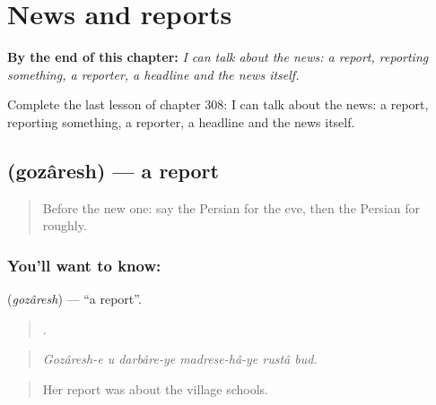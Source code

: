 
\chapter{News and reports}
\label{ch:fa-news-and-reports}

\begin{chapteropening}
\textbf{By the end of this chapter:} \emph{I can talk about the news: a report, reporting something, a reporter, a headline and the news itself.}

Complete the last lesson of chapter 308: I can talk about the news: a report, reporting something, a reporter, a headline and the news itself.
\end{chapteropening}

\section[\texorpdfstring{\fa{گزارش} (gozâresh)}{گزارش (gozâresh)}]{ (gozâresh) — a report}

\label{lesson:FA-C308-gozaresh}



\begin{quote}
Before the new one: say the Persian for the eve, then the Persian for roughly.
\end{quote}

\subsection*{You'll want to know: }
\textbf{} (\emph{gozâresh}) — \textquotedblleft{}a report\textquotedblright{}.

\begin{quote}
      .
\end{quote}

\begin{quote}
\emph{Gozâresh-e u darbâre-ye madrese-hâ-ye rustâ bud.}
\end{quote}

\begin{quote}
Her report was about the village schools.
\end{quote}

